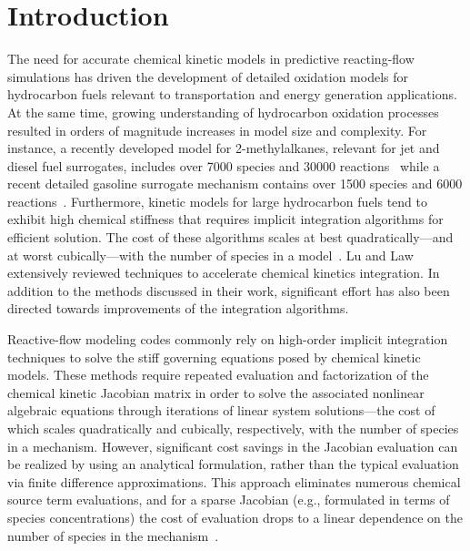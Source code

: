 \documentclass[final,twocolumn]{elsarticle}
\begin{document}
\clearpage

\section{Introduction}
\label{sec:Intro}
\ifmeasure
\addvspace{10pt}
\fi

The need for accurate chemical kinetic models in predictive reacting-flow simulations has driven the development of detailed oxidation models for hydrocarbon fuels relevant to transportation and energy generation applications.
At the same time, growing understanding of hydrocarbon oxidation processes resulted in orders of magnitude increases in model size and complexity.
For instance, a recently developed model for 2-methylalkanes, relevant for jet and diesel fuel surrogates, includes over 7000 species and 30000 reactions~\cite{Sarathy:2011kx} while a recent detailed gasoline surrogate mechanism contains over 1500 species and 6000 reactions~\cite{Mehl:2011jn}.
Furthermore, kinetic models for large hydrocarbon fuels tend to exhibit high chemical stiffness that requires implicit integration algorithms for efficient solution.
The cost of these algorithms scales at best quadratically---and at worst cubically---with the number of species in a model~\cite{Lu:2009gh}.
Lu and Law~\cite{Lu:2009gh} extensively reviewed techniques to accelerate chemical kinetics integration.
In addition to the methods discussed in their work, significant effort has also been directed towards improvements of the integration algorithms.

Reactive-flow modeling codes commonly rely on high-order implicit integration techniques to solve the stiff governing equations posed by chemical kinetic models.
These methods require repeated evaluation and factorization of the chemical kinetic Jacobian matrix in order to solve the associated nonlinear algebraic equations through iterations of linear system solutions---the cost of which scales quadratically and cubically, respectively, with the number of species in a mechanism.
However, significant cost savings in the Jacobian evaluation can be realized by using an analytical formulation, rather than the typical evaluation via finite difference approximations.
This approach eliminates numerous chemical source term evaluations, and for a sparse Jacobian (e.g., formulated in terms of species concentrations) the cost of evaluation drops to a linear dependence on the number of species in the mechanism~\cite{Lu:2009gh}.
\end{document}
